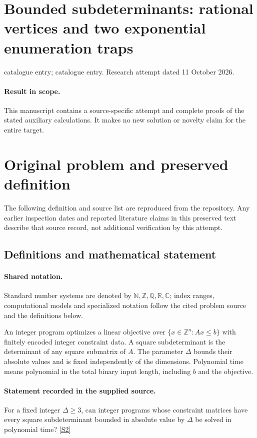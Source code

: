 \documentclass[11pt]{article}
\begin{document}
\section*{Bounded subdeterminants: rational vertices and two exponential enumeration traps}
\noindent catalogue entry; catalogue entry. Research attempt dated 11 October 2026.
\paragraph{Result in scope.}This manuscript contains a source-specific attempt and complete proofs of the stated auxiliary calculations. It makes no new solution or novelty claim for the entire target.
\section{Original problem and preserved definition}
The following definition and source list are reproduced from the repository. Any earlier inspection dates and reported literature claims in this preserved text describe that source record, not additional verification by this attempt.
\subsection{Definitions and mathematical statement}

\paragraph{Shared notation.}Standard number systems are denoted by $\mathbb N,\mathbb Z,\mathbb Q,\mathbb R,\mathbb C$; index ranges, computational models and specialized notation follow the cited problem source and the definitions below.


An integer program optimizes a linear objective over $\{x\in\mathbb Z^n:Ax\leq b\}$ with finitely encoded integer constraint data. A square subdeterminant is the determinant of any square submatrix of $A$. The parameter $\Delta$ bounds their absolute values and is fixed independently of the dimensions. Polynomial time means polynomial in the total binary input length, including $b$ and the objective.
\paragraph{Statement recorded in the supplied source.}
For a fixed integer $\Delta\geq3$, can integer programs whose constraint matrices have every square subdeterminant bounded in absolute value by $\Delta$ be solved in polynomial time? \href{https://doi.org/10.4171/owr/2021/53}{[S2]}
\end{document}
